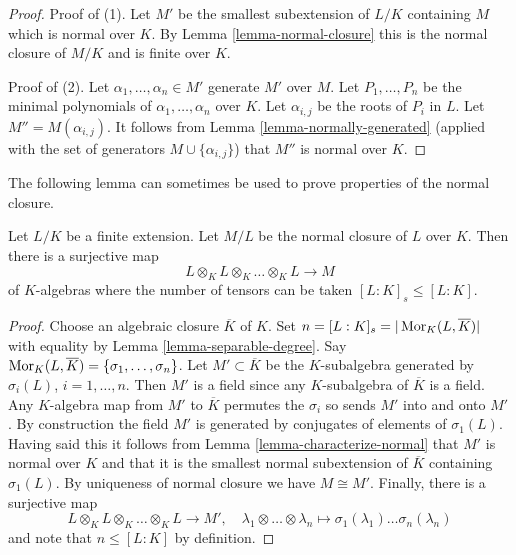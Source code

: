 \begin{proof}
Proof of (1). Let $M'$ be the smallest subextension of $L/K$ containing $M$
which is normal over $K$. By Lemma \ref{lemma-normal-closure}
this is the normal closure of $M/K$ and is finite over $K$.

\medskip\noindent
Proof of (2). Let $\alpha_1, \ldots, \alpha_n \in M'$ generate $M'$ over $M$.
Let $P_1, \ldots, P_n$ be the minimal polynomials of
$\alpha_1, \ldots, \alpha_n$ over $K$. Let $\alpha_{i, j}$ be the roots
of $P_i$ in $L$. Let $M''  = M(\alpha_{i, j})$. It follows from
Lemma \ref{lemma-normally-generated}
(applied with the set of generators $M \cup \{\alpha_{i, j}\}$)
that $M''$ is normal over $K$.
\end{proof}

\noindent
The following lemma can sometimes be used to prove properties
of the normal closure.

\begin{lemma}
\label{lemma-normal-closure-tensor-product}
Let $L/K$ be a finite extension. Let $M/L$ be the normal
closure of $L$ over $K$. Then there is a surjective map
$$
L \otimes_K L \otimes_K \ldots \otimes_K L \longrightarrow M
$$
of $K$-algebras where the number of tensors can be taken
$[L : K]_s \leq [L : K]$.
\end{lemma}

\begin{proof}
Choose an algebraic closure $\overline{K}$ of $K$.
Set $n = [L : K]_s = |\mathop{\mathrm{Mor}}\nolimits_K(L, \overline{K})|$ with equality by
Lemma \ref{lemma-separable-degree}.
Say $\mathop{\mathrm{Mor}}\nolimits_K(L, \overline{K}) = \{\sigma_1, \ldots, \sigma_n\}$.
Let $M' \subset \overline{K}$ be the $K$-subalgebra
generated by $\sigma_i(L)$, $i = 1, \ldots, n$. Then $M'$ is
a field since any $K$-subalgebra of $\overline{K}$ is a field.
Any $K$-algebra map from $M'$ to $\overline{K}$ permutes the $\sigma_i$
so sends $M'$ into and onto $M'$. By construction the field $M'$
is generated by conjugates of elements of $\sigma_1(L)$. Having said
this it follows from Lemma \ref{lemma-characterize-normal}
that $M'$ is normal over $K$ and that it is the
smallest normal subextension of $\overline{K}$ containing
$\sigma_1(L)$. By uniqueness of normal closure we have $M \cong M'$.
Finally, there is a surjective map
$$
L \otimes_K L \otimes_K \ldots \otimes_K L \longrightarrow M',
\quad
\lambda_1 \otimes \ldots \otimes \lambda_n \longmapsto
\sigma_1(\lambda_1) \ldots \sigma_n(\lambda_n)
$$
and note that $n \leq [L : K]$ by definition.
\end{proof}












